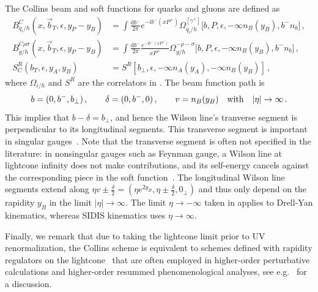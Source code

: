 \documentclass[11pt,a4paper]{article}
\newcommand{\df}{\mathrm{d}}
\newcommand{\img}{\mathrm{i}}
\newcommand{\eps}{\epsilon}
\newcommand{\nn}{\nonumber}
\newcommand{\bt}{\vec b_T}
\newcommand{\Corr}{\Omega}
\newcommand{\q}{q_i}
\newcommand{\nA}{n_A}
\newcommand{\nB}{n_B}
\begin{document}
The Collins beam and soft functions for quarks and gluons are defined as
\begin{align} \label{eq:def_Collins}
 B_{\q/h}^C(x, \bt, \eps, y_P - y_B) &
 = \int\!\frac{\df b^-}{2\pi} e^{-\img b^- (x P^+)}
   \Corr_{\q/h}^{[\gamma^+]}\bigl[b, P, \eps, -\infty \nB(y_B), b^- n_b \bigr]
\,,\nn\\
 B_{g/h}^{C\rho\sigma}(x, \bt, \eps, y_P - y_B) &
 = \int\!\frac{\df b^-}{2\pi} \frac{e^{-\img b^- (x P^+)}}{x P^+}
   \Corr_{g/h}^{-\rho-\sigma}\bigl[b, P, \eps, -\infty \nB(y_B), b^- n_b  \bigr]
\,,\nn\\
 S_C^R(b_T,\eps, y_A, y_B) &
 = S^R[b_\perp, \eps, -\infty \nA(y_A), -\infty \nB(y_B)]
\,,\end{align}
where $\Corr_{i/h}$ and $S^R$ are the correlators in .
The beam function path is 
\begin{align} \label{eq:beam_path_Collins}
 b = (0, b^-, b_\perp)
\,,\qquad
 \delta = (0, b^-, 0)
\,,\qquad
 v = n_B(y_B) \quad{\rm with}\quad |\eta| \to \infty
\,.\end{align}
This implies that $b - \delta = b_\perp$, and hence the Wilson line's tranverse segment is
perpendicular to its longitudinal segments. This transverse segment is important in singular gauges~\cite{Ji:2002aa}. Note that the transverse segment is often
not specified in the literature: in nonsingular gauges such as Feynman gauge, a Wilson line at lightcone infinity does not make contributions, and its self-energy
cancels against the corresponding piece in the soft function~\cite{Collins:1350496}.
The longitudinal Wilson line segments extend along
$\eta v \pm \tfrac{\delta}{2} = ( \eta e^{2 y_B}, \eta \pm \tfrac{\delta}{2} , 0_\perp)$
and thus only depend on the rapidity $y_B$ in the limit $|\eta|\to\infty$.
The limit $\eta\to-\infty$ taken in  applies to Drell-Yan kinematics,
whereas SIDIS kinematics uses $\eta \to \infty$.

Finally, we remark that due to taking the lightcone limit prior to UV renormalization,
the Collins scheme is equivalent to schemes defined with rapidity regulators on the lightcone~%
\cite{Becher:2010tm, Becher:2011dz, GarciaEchevarria:2011rb, Chiu:2012ir, Li:2016axz, Ebert:2018gsn}
that are often employed in higher-order perturbative calculations and higher-order resummed phenomenological analyses, see e.g.~ for a discussion.




\end{document}
